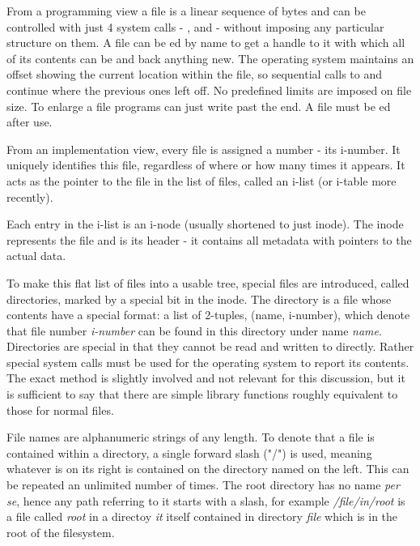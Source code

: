         From a programming view a file is a linear sequence of bytes and can be
        controlled with just 4 system calls -  ,
         and  - without imposing any particular
        structure on them. A file can be ed by name to get a
        handle to it with which all of its contents can be  and
         back anything new. The operating system maintains an
        offset showing the current location within the file, so sequential
        calls to  and  continue where the previous
        ones left off. No predefined limits are imposed on file size. To
        enlarge a file programs can just write past the end. A file must be
        ed after use.

        From an implementation view, every file is assigned a number - its
        i-number. It uniquely identifies this file, regardless of where or how
        many times it appears. It acts as the pointer to the file in the list
        of files, called an i-list (or i-table more recently).

        Each entry in the i-list is an i-node (usually shortened to just
        inode). The inode represents the file and is its header - it contains
        all metadata with pointers to the actual data.

        To make this flat list of files into a usable tree, special files are
        introduced, called directories, marked by a special bit in the inode.
        The directory is a file whose contents have a special format: a list of
        2-tuples, (name, i-number), which denote that file number
        \textit{i-number} can be found in this directory under name
        \textit{name}. Directories are special in that they cannot be read and
        written to directly. Rather special system calls must be used for the
        operating system to report its contents. The exact method is slightly
        involved and not relevant for this discussion, but it is sufficient to
        say that there are simple library functions roughly equivalent to those
        for normal files.

        File names are alphanumeric strings of any length. To denote that a
        file is contained within a directory, a single forward slash ("/") is
        used, meaning whatever is on its right is contained on the directory
        named on the left. This can be repeated an unlimited number of times.
        The root directory has no name \textit{per se}, hence any path referring
        to it starts with a slash, for example \textit{/file/in/root} is a file
        called \textit{root} in a directoy \textit{it} itself contained in
        directory \textit{file} which is in the root of the filesystem.

